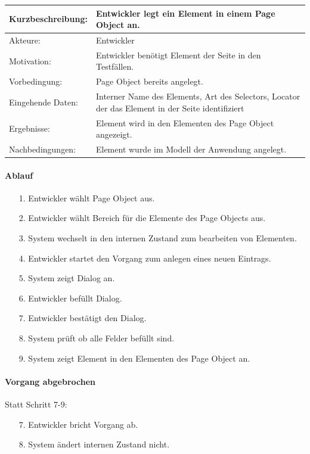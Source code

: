 \begin{tabular}[h]{|p{4cm}|p{}|}
\hline 
\rule[-1ex]{0pt}{2.5ex}Kurzbeschreibung: & 
Entwickler legt ein Element in einem Page Object an. \\  
\hline 
\rule[-1ex]{0pt}{2.5ex}Akteure: & 
Entwickler \\ 
\hline 
\rule[-1ex]{0pt}{2.5ex}Motivation: & 
Entwickler benötigt Element der Seite in den Testfällen. \\ 
\hline 
\rule[-1ex]{0pt}{2.5ex}Vorbedingung: & 
Page Object bereits angelegt.\\ 
\hline 
\rule[-1ex]{0pt}{2.5ex}Eingehende Daten: & Interner Name des Elements, Art des Selectors, Locator der das Element in der Seite identifiziert \\ 
\hline 
\rule[-1ex]{0pt}{2.5ex}Ergebnisse: & Element wird in den Elementen des Page Object angezeigt. \\ 
\hline 
\rule[-1ex]{0pt}{2.5ex}Nachbedingungen: & Element wurde im Modell der Anwendung angelegt.  \\ 
\hline 
\end{tabular} 

\paragraph{Ablauf}

\begin{itemize}[itemsep=0pt]
\item[1.] Entwickler wählt Page Object aus.
\item[2.] Entwickler wählt Bereich für die Elemente des Page Objects aus. 
\item[3.] System wechselt in den internen Zustand zum bearbeiten von Elementen.
\item[4.] Entwickler startet den Vorgang zum anlegen eines neuen Eintrags.
\item[5.] System zeigt Dialog an. 
\item[6.] Entwickler befüllt Dialog.
\item[7.] Entwickler bestätigt den Dialog.
\item[8.] System prüft ob alle Felder befüllt sind.
\item[9.] System zeigt Element in den Elementen des Page Object an.
\end{itemize}

\paragraph{Vorgang abgebrochen}
Statt Schritt 7-9:
\begin{itemize}[itemsep=0pt]
\item[7.] Entwickler bricht Vorgang ab. 
\item[8.] System ändert internen Zustand nicht. 
\end{itemize}

